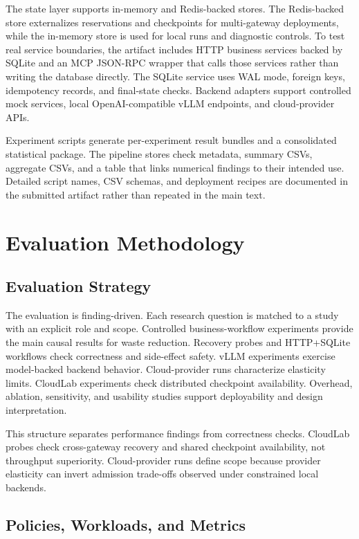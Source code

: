 \documentclass[5p,times]{elsarticle}
\begin{document}
The state layer supports in-memory and Redis-backed stores. The Redis-backed store externalizes reservations and checkpoints for multi-gateway deployments, while the in-memory store is used for local runs and diagnostic controls. To test real service boundaries, the artifact includes HTTP business services backed by SQLite and an MCP JSON-RPC wrapper that calls those services rather than writing the database directly. The SQLite service uses WAL mode, foreign keys, idempotency records, and final-state checks. Backend adapters support controlled mock services, local OpenAI-compatible vLLM endpoints, and cloud-provider APIs.

Experiment scripts generate per-experiment result bundles and a consolidated statistical package. The pipeline stores check metadata, summary CSVs, aggregate CSVs, and a table that links numerical findings to their intended use. Detailed script names, CSV schemas, and deployment recipes are documented in the submitted artifact rather than repeated in the main text.

\section{Evaluation Methodology}
\label{sec:evaluation_methodology}

\subsection{Evaluation Strategy}

The evaluation is finding-driven. Each research question is matched to a study with an explicit role and scope. Controlled business-workflow experiments provide the main causal results for waste reduction. Recovery probes and HTTP+SQLite workflows check correctness and side-effect safety. vLLM experiments exercise model-backed backend behavior. Cloud-provider runs characterize elasticity limits. CloudLab experiments check distributed checkpoint availability. Overhead, ablation, sensitivity, and usability studies support deployability and design interpretation.

This structure separates performance findings from correctness checks. CloudLab probes check cross-gateway recovery and shared checkpoint availability, not throughput superiority. Cloud-provider runs define scope because provider elasticity can invert admission trade-offs observed under constrained local backends.

\subsection{Policies, Workloads, and Metrics}
\end{document}

